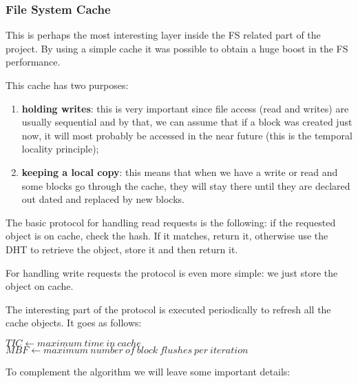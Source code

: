 \documentclass[times,9pt,article]{llncs}
\begin{document}
\subsubsection{File System Cache}

This is perhaps the most interesting layer inside the FS related part of the project. By using a simple cache it was possible to obtain a huge boost in the FS performance.

This cache has two purposes: 
\begin{enumerate}
\item \textbf{holding writes}: this is very important since file access (read and writes) are usually sequential and by that, we can assume that if a block was created just now, it will most probably be accessed in the near future (this is the temporal locality principle);
\item \textbf{keeping a local copy}: this means that when we have a write or read and some blocks go through the cache, they will stay there until they are declared out dated and replaced by new blocks.
\end{enumerate}


The basic protocol for handling read requests is the following: if the requested object is on cache, check the hash. If it matches, return it, otherwise use the DHT to retrieve the object, store it and then return it.

For handling write requests the protocol is even more simple: we just store the object on cache.

The interesting part of the protocol is executed periodically to refresh all the cache objects. It goes as follows:

\begin{algorithm}[H]
 $TIC \longleftarrow maximum\ time\ in\ cache$\;
 $MBF \longleftarrow maximum\ number\ of\ block\ flushes\ per\ iteration$\;
\end{algorithm}

To complement the algorithm we will leave some important details:
\end{document}
